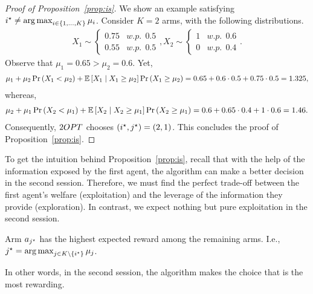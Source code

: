 \begin{proof}[Proof of Proposition~\ref{prop:is}]
We show an example satisfying ${i^\star} \neq \operatorname*{arg\,max}_{i\in \{1, \ldots, K \}}{\mu_i}$.
Consider $K=2$ arms, with the following distributions.
\begin{align*}
    X_1 \sim
    \begin{cases}
    0.75 & w.p. \ \  0.5 \\
    0.55 & w.p.\  \ 0.5
    \end{cases},
    X_2 \sim
    \begin{cases}
    1 & w.p. \ \  0.6 \\
    0 & w.p.\  \ 0.4
    \end{cases}.
\end{align*}
Observe that $\mu_1 = 0.65 > \mu_2=0.6$. Yet,
\begin{align*}
\mu_1  +\mu_2 \Pr\left( X_1 < \mu_2 \right)+\mathbb{E}\left[ X_1 \mid X_1 \geq \mu_2 \right]  \Pr\left( X_1 \geq \mu_2 \right)=
0.65  + 0.6 \cdot 0.5+ 0.75 \cdot 0.5 = 1.325,
\end{align*}
whereas,
\begin{align*}
\mu_2  +\mu_1 \Pr\left( X_2 < \mu_1 \right)+\mathbb{E}\left[ X_2 \mid X_2 \geq \mu_1 \right]  \Pr\left( X_2 \geq \mu_1 \right)=
0.6  + 0.65 \cdot 0.4 + 1 \cdot 0.6 = 1.46.
\end{align*}
Consequently, $2OPT$ chooses $({i^\star},{j^\star}) = (2,1)$.
This concludes the proof of Proposition~\ref{prop:is}.
\end{proof}
To get the intuition behind Proposition~\ref{prop:is}, recall that with the help of the information exposed by the first agent, the algorithm can make a better decision in the second session.
Therefore, we must find the perfect trade-off between the first agent's welfare (exploitation) and the leverage of the information they provide (exploration).
In contrast, we expect nothing but pure exploitation in the second session.
\begin{proposition}\label{prop:js}
Arm $a_{j^\star}$ has the highest expected reward among the remaining arms. I.e., ${j^\star} = \operatorname*{arg\,max}_{j\in K\setminus\{{i^\star}\}}{\mu_j}$.
\end{proposition}
In other words, in the second session, the algorithm makes the choice that is the most rewarding.
